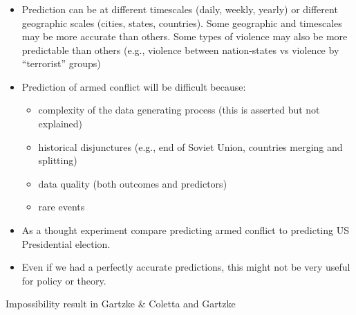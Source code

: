 \documentclass[aspectratio=169]{beamer}
\begin{document}
\begin{frame}
\frametitle{}

\begin{itemize}
\item Prediction can be at different timescales (daily, weekly, yearly) or different geographic scales (cities, states, countries).  Some geographic and timescales may be more accurate than others.  Some types of violence may also be more predictable than others (e.g., violence between nation-states vs violence by ``terrorist'' groups)
\pause
\item Prediction of armed conflict will be difficult because: 
\begin{itemize}
\item complexity of the data generating process (this is asserted but not explained)
\item historical disjunctures (e.g., end of Soviet Union, countries merging and splitting) 
\item data quality (both outcomes and predictors)
\item rare events
\end{itemize}
\pause
\item As a thought experiment compare predicting armed conflict to predicting US Presidential election.
\pause
\item Even if we had a perfectly accurate predictions, this might not be very useful for policy or theory.
\end{itemize}

\end{frame}
\begin{frame}

\begin{center}
Impossibility result in Gartzke \& Coletta and Gartzke
\end{center}

\end{frame}
\end{document}
